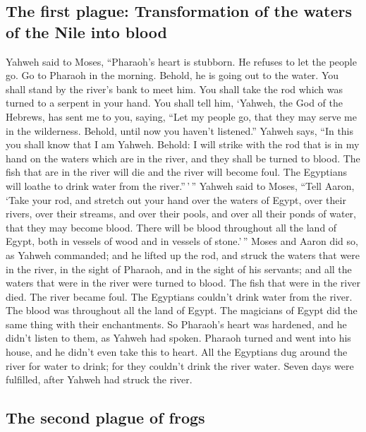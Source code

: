 \hypertarget{the-first-plague-transformation-of-the-waters-of-the-nile-into-blood}{%
\subsection{The first plague: Transformation of the waters of the Nile
into
blood}\label{the-first-plague-transformation-of-the-waters-of-the-nile-into-blood}}

 Yahweh said to Moses, ``Pharaoh's heart is stubborn. He
refuses to let the people go.  Go to Pharaoh in the
morning. Behold, he is going out to the water. You shall stand by the
river's bank to meet him. You shall take the rod which was turned to a
serpent in your hand.  You shall tell him, `Yahweh, the
God of the Hebrews, has sent me to you, saying, ``Let my people go, that
they may serve me in the wilderness. Behold, until now you haven't
listened.''  Yahweh says, ``In this you shall know that I
am Yahweh. Behold: I will strike with the rod that is in my hand on the
waters which are in the river, and they shall be turned to blood.
 The fish that are in the river will die and the river
will become foul. The Egyptians will loathe to drink water from the
river.''\,'\,''  Yahweh said to Moses, ``Tell Aaron,
`Take your rod, and stretch out your hand over the waters of Egypt, over
their rivers, over their streams, and over their pools, and over all
their ponds of water, that they may become blood. There will be blood
throughout all the land of Egypt, both in vessels of wood and in vessels
of stone.'\,''  Moses and Aaron did so, as Yahweh
commanded; and he lifted up the rod, and struck the waters that were in
the river, in the sight of Pharaoh, and in the sight of his servants;
and all the waters that were in the river were turned to blood.
 The fish that were in the river died. The river became
foul. The Egyptians couldn't drink water from the river. The blood was
throughout all the land of Egypt.  The magicians of Egypt
did the same thing with their enchantments. So Pharaoh's heart was
hardened, and he didn't listen to them, as Yahweh had spoken.
 Pharaoh turned and went into his house, and he didn't
even take this to heart.  All the Egyptians dug around
the river for water to drink; for they couldn't drink the river water.
 Seven days were fulfilled, after Yahweh had struck the
river.

\hypertarget{the-second-plague-of-frogs}{%
\subsection{The second plague of
frogs}\label{the-second-plague-of-frogs}}

